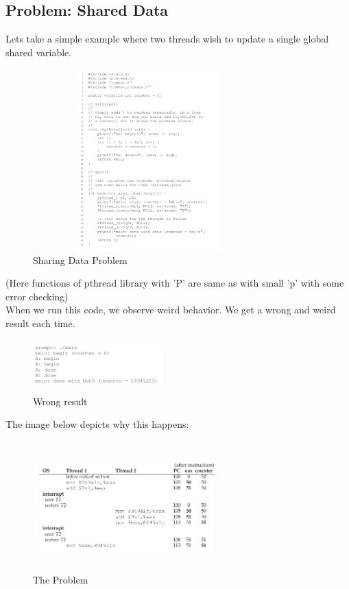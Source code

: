 \subsection{Problem: Shared Data}

Lets take a simple example where two threads wish to update a single global
shared variable.

\begin{figure}[h!]
    \begin{center}
        \includegraphics[width=9cm, height=7cm]{img/266.png}
        \caption{Sharing Data Problem}
    \end{center}
\end{figure}

(Here functions of pthread library with 'P' are same as with small 'p' with
some error checking)\\

When we run this code, we observe weird behavior. We get a wrong and weird
result each time.

\begin{figure}[h!]
    \begin{center}
        \includegraphics[width=5cm, height=2cm]{img/counterex.png}
        \caption{Wrong result}
    \end{center}
\end{figure}

The image below depicts why this happens:

\begin{figure}[h!]
    \begin{center}
        \includegraphics[width=7cm, height=5cm]{img/267.png}
        \caption{The Problem}
    \end{center}
\end{figure}

